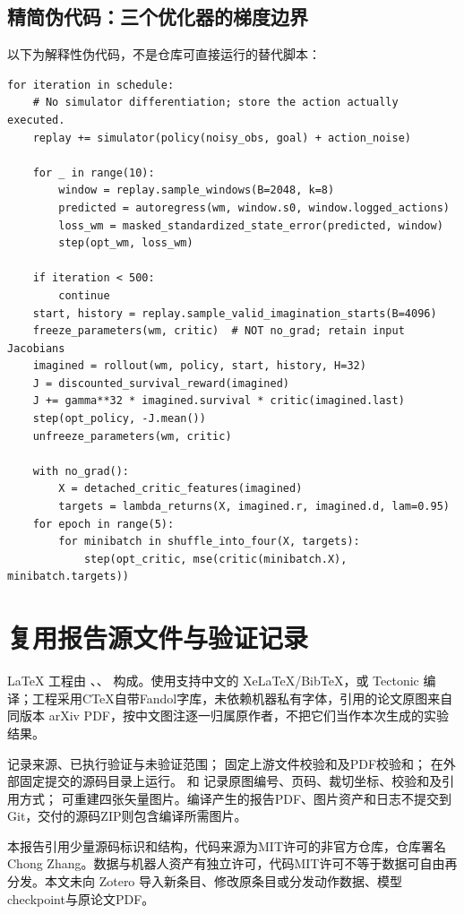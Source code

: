 \subsection{精简伪代码：三个优化器的梯度边界}
以下为解释性伪代码，不是仓库可直接运行的替代脚本：
\begin{lstlisting}
for iteration in schedule:
    # No simulator differentiation; store the action actually executed.
    replay += simulator(policy(noisy_obs, goal) + action_noise)

    for _ in range(10):
        window = replay.sample_windows(B=2048, k=8)
        predicted = autoregress(wm, window.s0, window.logged_actions)
        loss_wm = masked_standardized_state_error(predicted, window)
        step(opt_wm, loss_wm)

    if iteration < 500:
        continue
    start, history = replay.sample_valid_imagination_starts(B=4096)
    freeze_parameters(wm, critic)  # NOT no_grad; retain input Jacobians
    imagined = rollout(wm, policy, start, history, H=32)
    J = discounted_survival_reward(imagined)
    J += gamma**32 * imagined.survival * critic(imagined.last)
    step(opt_policy, -J.mean())
    unfreeze_parameters(wm, critic)

    with no_grad():
        X = detached_critic_features(imagined)
        targets = lambda_returns(X, imagined.r, imagined.d, lam=0.95)
    for epoch in range(5):
        for minibatch in shuffle_into_four(X, targets):
            step(opt_critic, mse(critic(minibatch.X), minibatch.targets))
\end{lstlisting}

\section{复用报告源文件与验证记录}
LaTeX 工程由 、、 构成。使用支持中文的 XeLaTeX/BibTeX，或 Tectonic 编译；工程采用CTeX自带Fandol字库，未依赖机器私有字体，引用的论文原图来自同版本 arXiv PDF，按中文图注逐一归属原作者，不把它们当作本次生成的实验结果。

 记录来源、已执行验证与未验证范围； 固定上游文件校验和及PDF校验和； 在外部固定提交的源码目录上运行。 和  记录原图编号、页码、裁切坐标、校验和及引用方式； 可重建四张矢量图片。编译产生的报告PDF、图片资产和日志不提交到Git，交付的源码ZIP则包含编译所需图片。

本报告引用少量源码标识和结构，代码来源为MIT许可的非官方仓库，仓库署名 Chong Zhang。数据与机器人资产有独立许可，代码MIT许可不等于数据可自由再分发。本文未向 Zotero 导入新条目、修改原条目或分发动作数据、模型checkpoint与原论文PDF。
